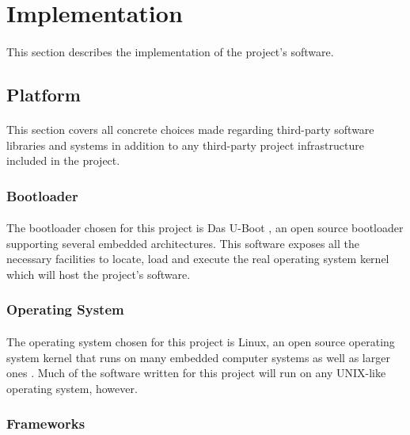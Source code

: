 \section{Implementation}

\paragraph{}
This section describes the implementation of the project's software.

\subsection{Platform}

\paragraph{}
This section covers all concrete choices made regarding third-party software libraries and systems in addition to any third-party project infrastructure included in the project.

\subsubsection{Bootloader}

\paragraph{}
The bootloader chosen for this project is Das U-Boot \cite{uboot}, an open source bootloader supporting several embedded architectures.
This software exposes all the necessary facilities to locate, load and execute the real operating system kernel which will host the project's software.

\subsubsection{Operating System}

\paragraph{}
The operating system chosen for this project is Linux, an open source operating system kernel that runs on many embedded computer systems as well as larger ones \cite{linux-readme}.
Much of the software written for this project will run on any UNIX-like operating system, however.

\subsubsection{Frameworks}

